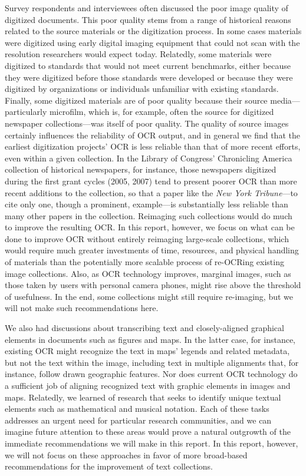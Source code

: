 \documentclass[twoside,11pt]{report}
\begin{document}
Survey respondents and interviewees often discussed the poor image quality of digitized documents. This poor quality stems from a range of historical reasons related to the source materials or the digitization process. In some cases materials were digitized using early digital imaging equipment that could not scan with the resolution researchers would expect today. Relatedly, some materials were digitized to standards that would not meet current benchmarks, either because they were digitized before those standards were developed or because they were digitized by organizations or individuals unfamiliar with existing standards. Finally, some digitized materials are of poor quality because their source media---particularly microfilm, which is, for example, often the source for digitized newspaper collections---was itself of poor quality. The quality of source images certainly influences the reliability of OCR output, and in general we find that the earliest digitization projects' OCR is less reliable than that of more recent efforts, even within a given collection. In the Library of Congress' Chronicling America collection of historical newspapers, for instance, those newspapers digitized during the first grant cycles (2005, 2007) tend to present poorer OCR than more recent additions to the collection, so that a paper like the \emph{New York Tribune}---to cite only one, though a prominent, example---is substantially less reliable than many other papers in the collection. Reimaging such collections would do much to improve the resulting OCR. In this report, however, we focus on what can be done to improve OCR without entirely reimaging large-scale collections, which would require much greater investments of time, resources, and physical handling of materials than the potentially more scalable process of re-OCRing existing image collections. Also, as OCR technology improves, marginal images, such as those taken by users with personal camera phones, might rise above the threshold of usefulness. In the end, some collections might still require re-imaging, but we will not make such recommendations here.

We also had discussions about transcribing text and closely-aligned graphical elements in documents such as figures and maps. In the latter case, for instance, existing OCR might recognize the text in maps' legends and related metadata, but not the text within the image, including text in multiple alignments that, for instance, follow drawn geographic features. Nor does current OCR technology do a sufficient job of aligning recognized text with graphic elements in images and maps. Relatedly, we learned of research that seeks to identify unique textual elements such as mathematical and musical notation. Each of these tasks addresses an urgent need for particular research communities, and we can imagine future attention to these areas would prove a natural outgrowth of the immediate recommendations we will make in this report. In this report, however, we will not focus on these approaches in favor of more broad-based recommendations for the improvement of text collections.
\end{document}
